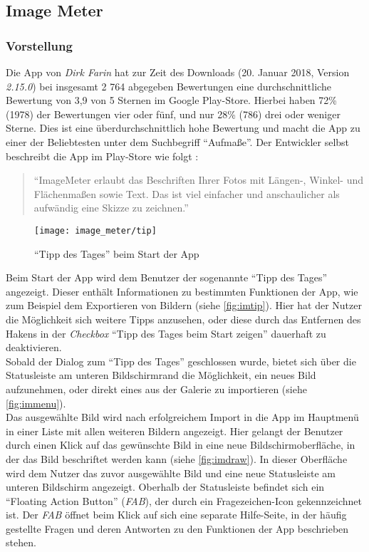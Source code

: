 \subsection{Image Meter}
\subsubsection{Vorstellung}
Die App \im{} von \emph{Dirk Farin} hat zur Zeit des Downloads (20. Januar 2018, Version \emph{2.15.0}) bei insgesamt 2 764 abgegeben Bewertungen eine durchschnittliche Bewertung von 3,9 von 5 Sternen im Google Play-Store.
Hierbei haben 72\% (1978) der Bewertungen vier oder fünf, und nur 28\% (786) drei oder weniger Sterne.
Dies ist eine überdurchschnittlich hohe Bewertung und macht die App zu einer der Beliebtesten unter dem Suchbegriff ``Aufmaße''.
Der Entwickler selbst beschreibt die App im Play-Store wie folgt \citep{FarinIM}:

\begin{quote}
  ``ImageMeter erlaubt das Beschriften Ihrer Fotos mit Längen-, Winkel- und Flächenmaßen sowie Text.
  Das ist viel einfacher und anschaulicher als aufwändig eine Skizze zu zeichnen.''
\end{quote}

\noindent
\begin{wrapfigure}{R}{0.5\textwidth}
  \centering
  \texttt{[image: image\_meter/tip]}
  \caption{``Tipp des Tages'' beim Start der App}
  \label{fig:imtip}
\end{wrapfigure}
Beim Start der App wird dem Benutzer der sogenannte ``Tipp des Tages'' angezeigt.
Dieser enthält Informationen zu bestimmten Funktionen der App, wie zum Beispiel dem Exportieren von Bildern (siehe \autoref{fig:imtip}).
Hier hat der Nutzer die Möglichkeit sich weitere Tipps anzusehen, oder diese durch das Entfernen des Hakens in der \emph{Checkbox} ``Tipp des Tages beim Start zeigen'' dauerhaft zu deaktivieren. \\

Sobald der Dialog zum ``Tipp des Tages'' geschlossen wurde, bietet sich über die Statusleiste am unteren Bildschirmrand die Möglichkeit, ein neues Bild aufzunehmen, oder direkt eines aus der Galerie zu importieren (siehe \autoref{fig:immenu}). \\

Das ausgewählte Bild wird nach erfolgreichem Import in die App im Hauptmenü in einer Liste mit allen weiteren Bildern angezeigt.
Hier gelangt der Benutzer durch einen Klick auf das gewünschte Bild in eine neue Bildschirmoberfläche, in der das Bild beschriftet werden kann (siehe \autoref{fig:imdraw}).
In dieser Oberfläche wird dem Nutzer das zuvor ausgewählte Bild und eine neue Statusleiste am unteren Bildschirm angezeigt.
Oberhalb der Statusleiste befindet sich ein ``Floating Action Button'' (\emph{FAB}), der durch ein Fragezeichen-Icon gekennzeichnet ist.
Der \emph{FAB} öffnet beim Klick auf sich eine separate Hilfe-Seite, in der häufig gestellte Fragen und deren Antworten zu den Funktionen der App beschrieben stehen. \\

